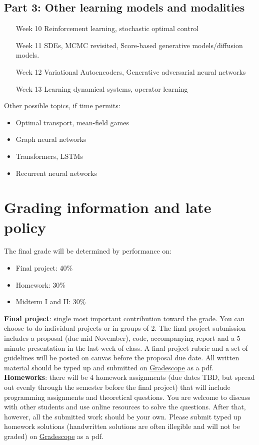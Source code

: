 \documentclass[12pt]{article}
\begin{document}
\subsection*{Part 3: Other learning models and modalities}
\begin{itemize}
	\item[Week 10] Reinforcement learning, stochastic optimal control
	\item[Week 11 ] SDEs, MCMC revisited, Score-based generative models/diffusion models.
	\item[Week 12] Variational Autoencoders, Generative adversarial neural networks
	\item[Week 13] Learning dynamical systems, operator learning
\end{itemize}
Other possible topics, if time permits:
\begin{itemize}
	\item Optimal transport, mean-field games
	\item Graph neural networks
	\item Transformers, LSTMs
	\item Recurrent neural networks
\end{itemize}

\section{Grading information and late policy}

The final grade will be determined by performance on:
\begin{itemize}
	\item Final project: 40\%
	\item Homework: 30\%
	\item Midterm I and II: 30\%
\end{itemize}

\textbf{Final project}: single most important contribution toward the grade. You can choose to do individual projects or in groups of 2. The final project submission includes a proposal (due mid November), code, accompanying report and a 5-minute presentation in the last week of class. A final project rubric and a set of guidelines will be posted on canvas before the proposal due date. All written material should be typed up and submitted on \href{https://www.gradescope.com/courses/578036}{Gradescope} as a pdf.\\

\textbf{Homeworks}: there will be 4 homework assignments (due dates TBD, but spread out evenly through the semester before the final project) that will include programming assignments and theoretical questions. You are welcome to discuss with other students and use online resources to solve the questions. After that, however, all the submitted work should be your own. Please submit typed up homework solutions (handwritten solutions are often illegible and will not be graded) on \href{https://www.gradescope.com/courses/578036}{Gradescope} as a pdf. \\
\end{document}
